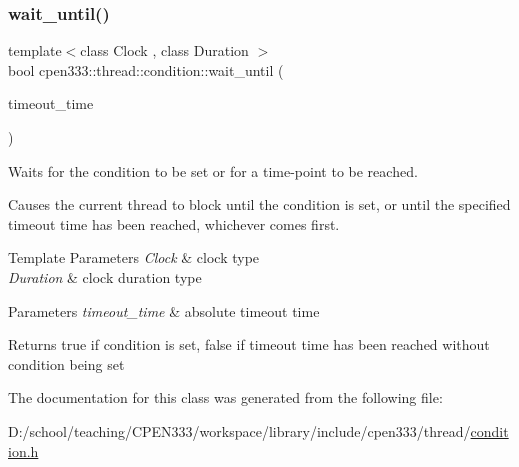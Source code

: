 \subsubsection{\texorpdfstring{wait\+\_\+until()}{wait\_until()}}
{\footnotesize\ttfamily template$<$class Clock , class Duration $>$ \\
bool cpen333\+::thread\+::condition\+::wait\+\_\+until (\begin{DoxyParamCaption}\item[{const std\+::chrono\+::time\+\_\+point$<$ Clock, Duration $>$ \&}]{timeout\+\_\+time }\end{DoxyParamCaption})\hspace{0.3cm}{\ttfamily [inline]}}



Waits for the condition to be set or for a time-\/point to be reached. 

Causes the current thread to block until the condition is set, or until the specified timeout time has been reached, whichever comes first.


\begin{DoxyTemplParams}{Template Parameters}
{\em Clock} & clock type \\
\hline
{\em Duration} & clock duration type \\
\hline
\end{DoxyTemplParams}

\begin{DoxyParams}{Parameters}
{\em timeout\+\_\+time} & absolute timeout time \\
\hline
\end{DoxyParams}
\begin{DoxyReturn}{Returns}
{\ttfamily true} if condition is set, {\ttfamily false} if timeout time has been reached without condition being set 
\end{DoxyReturn}


The documentation for this class was generated from the following file\+:\begin{DoxyCompactItemize}
\item 
D\+:/school/teaching/\+C\+P\+E\+N333/workspace/library/include/cpen333/thread/\hyperlink{thread_2condition_8h}{condition.\+h}\end{DoxyCompactItemize}
